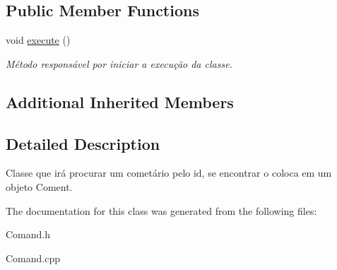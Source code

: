 \subsection*{Public Member Functions}
\begin{DoxyCompactItemize}
\item 
\hypertarget{class_command_find_coment_a5e0b7e24dbe78155bfef3a3e12f329de}{void \hyperlink{class_command_find_coment_a5e0b7e24dbe78155bfef3a3e12f329de}{execute} ()}\label{class_command_find_coment_a5e0b7e24dbe78155bfef3a3e12f329de}

\begin{DoxyCompactList}\small\item\em Método responsável por iniciar a execução da classe. \end{DoxyCompactList}\end{DoxyCompactItemize}
\subsection*{Additional Inherited Members}


\subsection{Detailed Description}
Classe que irá procurar um cometário pelo id, se encontrar o coloca em um objeto Coment. 

The documentation for this class was generated from the following files\-:\begin{DoxyCompactItemize}
\item 
Comand.\-h\item 
Comand.\-cpp\end{DoxyCompactItemize}
